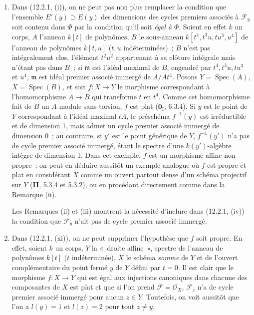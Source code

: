 \begin{remarks}[12.2.3]
\begin{enumerate}[label=(\roman*)]
  \item Dans (12.2.1, (i)), on ne peut pas non plus remplacer la condition que
  l'ensemble $E'(y)\supset E(y)$ des dimensions des cycles premiers associés à
  $\mathcal F_y$ soit contenu dans $\Phi$ par la condition qu'il soit
  \emph{égal à} $\Phi$. Soient en effet $k$ un corps, $A$ l'anneau $k[t]$ de
  polynômes, $B$ le sous-anneau $k[t^4,t^3u,tu^3,u^4]$ de l'anneau de polynômes
  $k[t,u]$ ($t,u$ indéterminées)~; $B$ n'est pas intégralement clos, l'élément
  $t^2u^2$ appartenant à sa clôture intégrale mais n'étant pas dans $B$~; si
  $\mathfrak m$ est l'idéal maximal de $B$, engendré par $t^4,t^3u,tu^3$ et
  $u^4$, $\mathfrak m$ est idéal premier associé immergé de $A/At^4$. Posons
  $Y=\operatorname{Spec}(A)$, $X=\operatorname{Spec}(B)$, et soit $f:X\to Y$
  le morphisme correspondant à l'homomorphisme $A\to B$ qui transforme $t$ en
  $t^4$. Comme cet homomorphisme fait de $B$ un $A$-module sans torsion, $f$
  est plat ($\mathbf 0_{\mathrm I}$, 6.3.4). Si $y$ est le point de $Y$
  correspondant à l'idéal maximal $tA$, le préschéma $f^{-1}(y)$ est
  irréductible et de dimension 1, mais admet un cycle premier associé immergé
  de dimension 0~; au contraire, si $y'$ est le point générique de $Y$,
  $f^{-1}(y')$ n'a pas de cycle premier associé immergé, étant le spectre d'une
  $k(y')$-algèbre intègre de dimension 1. Dans cet exemple, $f$ est un morphisme
  affine non propre~; on peut en déduire aussitôt un exemple analogue où $f$
  est propre et plat en considérant $X$ comme un ouvert partout dense d'un
  schéma projectif sur $Y$ (\textbf{II}, 5.3.4 et 5.3.2), ou en procédant
  directement comme dans la Remarque (ii).

  Les Remarques (ii) et (iii) montrent la nécessité d'inclure dans (12.2.1,
  (iv)) la condition que $\mathcal F_y$ n'ait pas de cycle premier associé
  immergé.

  \item Dans (12.2.1, (xi)), on ne peut supprimer l'hypothèse que $f$ soit
  propre. En effet, soient $k$ un corps, $Y$ la «~droite affine~», spectre de
  l'anneau de polynômes $k[t]$ ($t$ indéterminée), $X$ le schéma \emph{somme}
  de $Y$ et de l'ouvert complémentaire du point fermé $y$ de $Y$ défini par
  $t=0$. Il est clair que le morphisme $f:X\to Y$ qui est égal aux injections
  canoniques dans chacune des composantes de $X$ est plat et que si l'on prend
  $\mathcal F=\mathcal O_X$, $\mathcal F_z$ n'a de cycle premier associé
  immergé pour aucun $z\in Y$. Toutefois, on voit aussitôt que l'on a $l(y)=1$
  et $l(z)=2$ pour tout $z\neq y$.


\end{enumerate}
\end{remarks}
